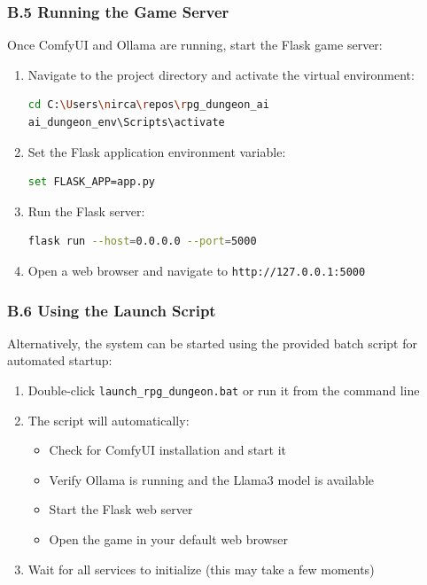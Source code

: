 \documentclass[12pt,a4paper]{article}
\begin{document}
\subsubsection*{B.5 Running the Game Server}

    Once ComfyUI and Ollama are running, start the Flask game server:

    \begin{enumerate}
        \item Navigate to the project directory and activate the virtual environment:
        \begin{lstlisting}[language=bash]
cd C:\Users\nirca\repos\rpg_dungeon_ai
ai_dungeon_env\Scripts\activate
        \end{lstlisting}
        \item Set the Flask application environment variable:
        \begin{lstlisting}[language=bash]
set FLASK_APP=app.py
        \end{lstlisting}
        \item Run the Flask server:
        \begin{lstlisting}[language=bash]
flask run --host=0.0.0.0 --port=5000
        \end{lstlisting}
        \item Open a web browser and navigate to \texttt{http://127.0.0.1:5000}
    \end{enumerate}

\subsubsection*{B.6 Using the Launch Script}

    Alternatively, the system can be started using the provided batch script for automated startup:

    \begin{enumerate}
        \item Double-click \texttt{launch\_rpg\_dungeon.bat} or run it from the command line
        \item The script will automatically:
        \begin{itemize}
            \item Check for ComfyUI installation and start it
            \item Verify Ollama is running and the Llama3 model is available
            \item Start the Flask web server
            \item Open the game in your default web browser
        \end{itemize}
        \item Wait for all services to initialize (this may take a few moments)
    \end{enumerate}
\end{document}
